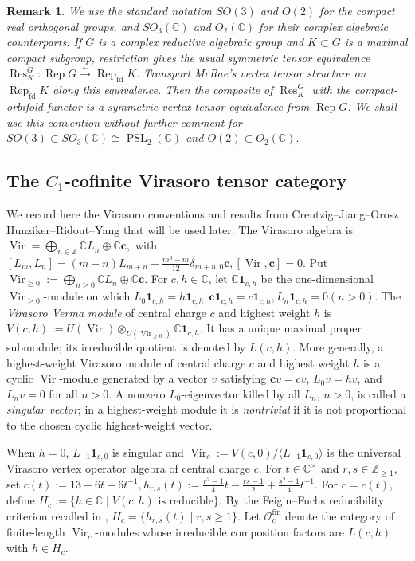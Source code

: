 \documentclass[10pt,a4paper]{amsart}
\numberwithin{equation}{section} \newtheorem{thm}{Theorem}[section] \newtheorem{lem}[thm]{Lemma} \newtheorem{ex}[thm]{Example} \newtheorem{prop}[thm]{Proposition} \newtheorem{cor}[thm]{Corollary} \newtheorem{defi}[thm]{Definition} \newtheorem{rmk}[thm]{Remark} \newtheorem{notation}[thm]{Notation}
\newcommand{\one}{\mathbf{1}}
\newcommand{\Res}{\operatorname{Res}}
\newcommand{\Vir}{\operatorname{Vir}}
\newcommand{\Rep}{\operatorname{Rep}}
\newcommand{\PSLtwo}{\operatorname{PSL}_2(\C)}
\def\Z{\mathbb{Z}} \def\N{\mathbb{N}} \def\A{\mathbb{A}} \def\C{\mathbb{C}} \def\R{\mathbb{R}} \def\Q{\mathbb{Q}} \def\F{\mathbb{F}}
\begin{document}
\begin{rmk}\label{rmk:compact-complexification}
We use the standard notation $SO(3)$ and $O(2)$ for the compact real orthogonal groups, and $SO_3(\C)$ and $O_2(\C)$ for their complex algebraic counterparts. If $G$ is a complex reductive algebraic group and $K\subset G$ is a maximal compact subgroup, restriction gives the usual symmetric tensor equivalence $ \Res^G_K:\Rep G\overset{\sim}{\longrightarrow}\Rep_{\mathrm{fd}}K. $ Transport McRae's vertex tensor structure on $\Rep_{\mathrm{fd}}K$ along this equivalence. Then the composite of $\Res^G_K$ with the compact-orbifold functor is a symmetric vertex tensor equivalence from $\Rep G$. We shall use this convention without further comment for $ SO(3)\subset SO_3(\C)\cong\PSLtwo $ and $ O(2)\subset O_2(\C). $
\end{rmk}

\subsection{The \texorpdfstring{$C_1$}{C1}-cofinite Virasoro tensor category}
\label{subsec:CJORY-package}

We record here the Virasoro conventions and results from Creutzig--Jiang--Orosz Hunziker--Ridout--Yang \cite[Section~2.2]{CJORY} that will be used later. The Virasoro algebra is \(\Vir=\bigoplus_{n\in\Z}\C L_n\oplus\C\mathbf c,\) with \([L_m,L_n]=(m-n)L_{m+n}+\frac{m^3-m}{12}\delta_{m+n,0}\mathbf c,[\Vir,\mathbf c]=0.\) Put \(\Vir_{\ge0}:=\bigoplus_{n\ge0}\C L_n\oplus\C\mathbf c\). For $c,h\in\C$, let $\C\one_{c,h}$ be the one-dimensional $\Vir_{\ge0}$-module on which \(L_0\one_{c,h}=h\one_{c,h},\mathbf c\one_{c,h}=c\one_{c,h},L_n\one_{c,h}=0(n>0).\) The \emph{Virasoro Verma module} of central charge $c$ and highest weight $h$ is \(V(c,h):=U(\Vir)\otimes_{U(\Vir_{\ge0})}\C\one_{c,h}.\) It has a unique maximal proper submodule; its irreducible quotient is denoted by $L(c,h)$. More generally, a highest-weight Virasoro module of central charge $c$ and highest weight $h$ is a cyclic $\Vir$-module generated by a vector $v$ satisfying \(\mathbf c v=cv\), \(L_0v=hv\), and \(L_nv=0\) for all $n>0$. A nonzero $L_0$-eigenvector killed by all $L_n$, $n>0$, is called a \emph{singular vector}; in a highest-weight module it is \emph{nontrivial} if it is not proportional to the chosen cyclic highest-weight vector.

When $h=0$, $L_{-1}\one_{c,0}$ is singular and \(\Vir_c:=V(c,0)/\langle L_{-1}\one_{c,0}\rangle\) is the universal Virasoro vertex operator algebra of central charge $c$. For $t\in\C^\times$ and $r,s\in\Z_{\ge1}$, set \(c(t):=13-6t-6t^{-1},h_{r,s}(t):=\frac{r^2-1}{4}t-\frac{rs-1}{2}+\frac{s^2-1}{4}t^{-1}.\) For $c=c(t)$, define \(H_c:=\{h\in\C\mid V(c,h)\text{ is reducible}\}.\) By the Feigin--Fuchs reducibility criterion recalled in \cite[Section~2.2]{CJORY}, \(H_c=\{h_{r,s}(t)\mid r,s\ge1\}\). Let $\mathcal O_c^{\mathrm{fin}}$ denote the category of finite-length $\Vir_c$-modules whose irreducible composition factors are $L(c,h)$ with $h\in H_c$.
\end{document}
